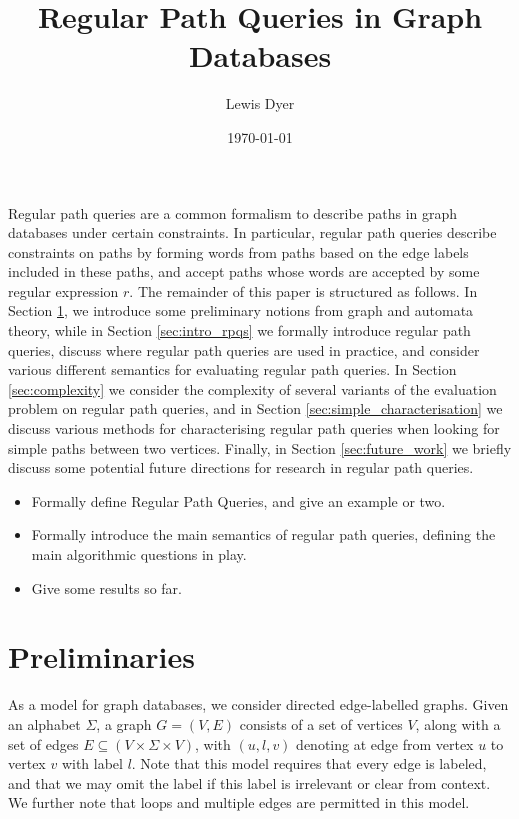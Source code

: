 \documentclass{article}
\title{Regular Path Queries in Graph Databases}
\date{\today}
\author{Lewis Dyer}
\begin{document}
\maketitle

Regular path queries are a common formalism to describe paths in graph databases under certain constraints. In particular, regular path queries describe constraints on paths by forming words from paths based on the edge labels included in these paths, and accept paths whose words are accepted by some regular expression $r$. The remainder of this paper is structured as follows. In Section \ref{sec:prelims}, we introduce some preliminary notions from graph and automata theory, while in Section \ref{sec:intro_rpqs} we formally introduce regular path queries, discuss where regular path queries are used in practice, and consider various different semantics for evaluating regular path queries. In Section \ref{sec:complexity} we consider the complexity of several variants of the evaluation problem on regular path queries, and in Section \ref{sec:simple_characterisation} we discuss various methods for characterising regular path queries when looking for simple paths between two vertices. Finally, in Section \ref{sec:future_work} we briefly discuss some potential future directions for research in regular path queries.

\begin{itemize}
    \item Formally define Regular Path Queries, and give an example or two.
    \item Formally introduce the main semantics of regular path queries, defining the main algorithmic questions in play.
    \item Give some results so far.
\end{itemize}

\section{Preliminaries}
\label{sec:prelims}

As a model for graph databases, we consider directed edge-labelled graphs. Given an alphabet $\Sigma$, a graph $G = (V,E)$ consists of a set of vertices $V$, along with a set of edges $E \subseteq (V \times \Sigma \times V)$, with $(u, l, v)$ denoting at edge from vertex $u$ to vertex $v$ with label $l$. Note that this model requires that every edge is labeled, and that we may omit the label if this label is irrelevant or clear from context. We further note that loops and multiple edges are permitted in this model.
\end{document}
